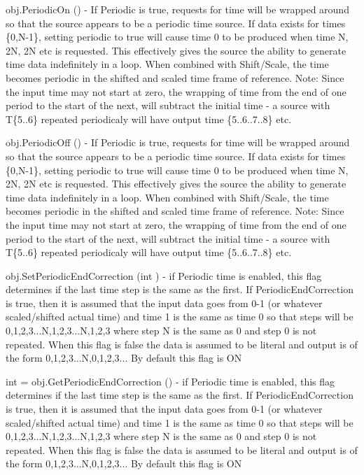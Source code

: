 \begin{DoxyItemize}
\item {\ttfamily obj.\-Periodic\-On ()} -\/ If Periodic is true, requests for time will be wrapped around so that the source appears to be a periodic time source. If data exists for times \{0,N-\/1\}, setting periodic to true will cause time 0 to be produced when time N, 2\-N, 2\-N etc is requested. This effectively gives the source the ability to generate time data indefinitely in a loop. When combined with Shift/\-Scale, the time becomes periodic in the shifted and scaled time frame of reference. Note\-: Since the input time may not start at zero, the wrapping of time from the end of one period to the start of the next, will subtract the initial time -\/ a source with T\{5..6\} repeated periodicaly will have output time \{5..6..7..8\} etc.  
\item {\ttfamily obj.\-Periodic\-Off ()} -\/ If Periodic is true, requests for time will be wrapped around so that the source appears to be a periodic time source. If data exists for times \{0,N-\/1\}, setting periodic to true will cause time 0 to be produced when time N, 2\-N, 2\-N etc is requested. This effectively gives the source the ability to generate time data indefinitely in a loop. When combined with Shift/\-Scale, the time becomes periodic in the shifted and scaled time frame of reference. Note\-: Since the input time may not start at zero, the wrapping of time from the end of one period to the start of the next, will subtract the initial time -\/ a source with T\{5..6\} repeated periodicaly will have output time \{5..6..7..8\} etc.  
\item {\ttfamily obj.\-Set\-Periodic\-End\-Correction (int )} -\/ if Periodic time is enabled, this flag determines if the last time step is the same as the first. If Periodic\-End\-Correction is true, then it is assumed that the input data goes from 0-\/1 (or whatever scaled/shifted actual time) and time 1 is the same as time 0 so that steps will be 0,1,2,3...N,1,2,3...N,1,2,3 where step N is the same as 0 and step 0 is not repeated. When this flag is false the data is assumed to be literal and output is of the form 0,1,2,3...N,0,1,2,3... By default this flag is O\-N  
\item {\ttfamily int = obj.\-Get\-Periodic\-End\-Correction ()} -\/ if Periodic time is enabled, this flag determines if the last time step is the same as the first. If Periodic\-End\-Correction is true, then it is assumed that the input data goes from 0-\/1 (or whatever scaled/shifted actual time) and time 1 is the same as time 0 so that steps will be 0,1,2,3...N,1,2,3...N,1,2,3 where step N is the same as 0 and step 0 is not repeated. When this flag is false the data is assumed to be literal and output is of the form 0,1,2,3...N,0,1,2,3... By default this flag is O\-N  

\end{DoxyItemize}
